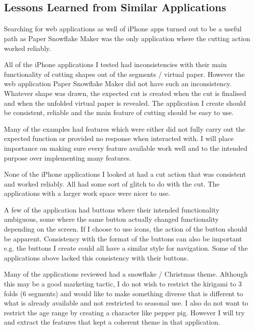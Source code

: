 \documentclass[11pt]{article}
\begin{document}
       \subsection{Lessons Learned from Similar Applications}
       
            \paragraph{}
            Searching for web applications as well of iPhone apps turned out to be a useful path as Paper Snowflake Maker was the only application where the cutting action worked reliably.
            
            All of the iPhone applications I tested had inconsistencies with their main functionality of cutting shapes out of the segments / virtual paper. However the web application Paper Snowflake Maker did not have such an inconsistency. Whatever shape was drawn, the expected cut is created when the cut is finalised and when the unfolded virtual paper is revealed. The application I create should be consistent, reliable and the main feature of cutting should be easy to use.  
            
            Many of the examples had features which were either did not fully carry out the expected function or provided no response when interacted with. I will place importance on making sure every feature available work well and to the intended purpose over implementing many features. 
            
            None of the iPhone applications I looked at had a cut action that was consistent and worked reliably. All had some sort of glitch to do with the cut. The applications with a larger work space were nicer to use. 
            
            A few of the application had buttons where their intended functionality ambiguous, some where the same button actually changed functionality depending on the screen. If I choose to use icons, the action of the button should be apparent. Consistency with the format of the buttons can also be important e.g. the buttons I create could all have a similar style for navigation. Some of the applications above lacked this consistency with their buttons. 
            
            Many of the applications reviewed had a snowflake / Christmas theme. Although this may be a good marketing tactic, I do not wish to restrict the kirigami to 3 folds (6 segments) and would like to make something diverse that is different to what is already available and not restricted to seasonal use. I also do not want to restrict the age range by creating a character like pepper pig. However I will try and extract the features that kept a coherent theme in that application.
            
\end{document}
